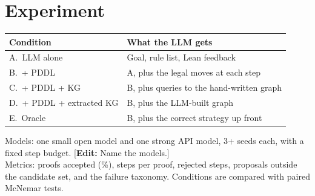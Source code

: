 \documentclass[11pt]{article}
\newcommand{\note}[1]{\textcolor{orange!80!black}{\small[\textbf{Edit:} #1]}}
\begin{document}
\section{Experiment}
\begin{center}
\small
\begin{tabularx}{\linewidth}{@{}lX@{}}
\toprule
Condition & What the LLM gets \\
\midrule
A.\ LLM alone & Goal, rule list, Lean feedback \\
B.\ + PDDL & A, plus the legal moves at each step \\
C.\ + PDDL + KG & B, plus queries to the hand-written graph \\
D.\ + PDDL + extracted KG & B, plus the LLM-built graph \\
E.\ Oracle & B, plus the correct strategy up front \\
\bottomrule
\end{tabularx}
\end{center}
Models: one small open model and one strong API model, 3+ seeds each, with a fixed step budget. \note{Name the models.}\\
Metrics: proofs accepted (\%), steps per proof, rejected steps, proposals outside the candidate set, and the failure taxonomy. Conditions are compared with paired McNemar tests.
\end{document}
